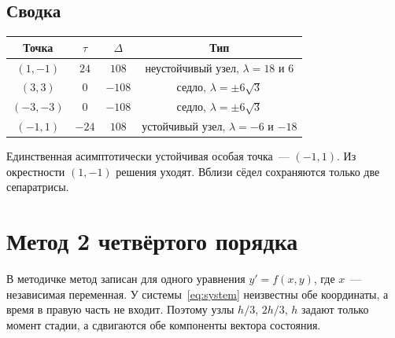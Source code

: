 \documentclass[12pt,a4paper]{article}
\begin{document}
\subsection{Сводка}

\begin{center}
\begin{tabular}{cccc}
\toprule
Точка & \(\tau\) & \(\Delta\) & Тип \\
\midrule
\((1,-1)\)   & \(24\)  & \(108\)  & неустойчивый узел, \(\lambda = 18\) и \(6\) \\
\((3,3)\)    & \(0\)   & \(-108\) & седло, \(\lambda = \pm 6\sqrt{3}\) \\
\((-3,-3)\)  & \(0\)   & \(-108\) & седло, \(\lambda = \pm 6\sqrt{3}\) \\
\((-1,1)\)   & \(-24\) & \(108\)  & устойчивый узел, \(\lambda = -6\) и \(-18\) \\
\bottomrule
\end{tabular}
\end{center}

Единственная асимптотически устойчивая особая точка~--- \((-1,1)\). Из окрестности \((1,-1)\) решения уходят. Вблизи сёдел сохраняются только две сепаратрисы.

\section{Метод 2 четвёртого порядка}

В методичке метод записан для одного уравнения \(y' = f(x,y)\), где \(x\)~--- независимая переменная. У системы~\eqref{eq:system} неизвестны обе координаты, а время в правую часть не входит. Поэтому узлы \(h/3\), \(2h/3\), \(h\) задают только момент стадии, а сдвигаются обе компоненты вектора состояния.
\end{document}
